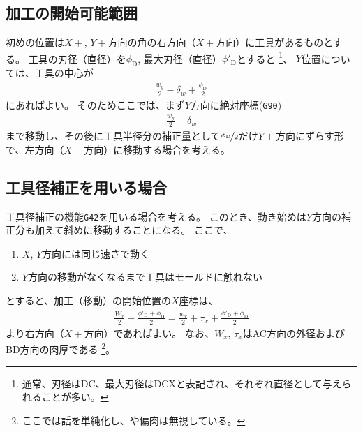 \subsection{加工の開始可能範囲}
初めの位置は$X+$, $Y+$方向の角の右方向（$X+$方向）に工具があるものとする。
工具の刃径（直径）を$\phi_\mathrm D$, 最大刃径（直径）$\phi'_\mathrm D$とすると
\footnote{通常、刃径はDC、最大刃径はDCXと表記され、それぞれ直径として与えられることが多い。}、
$Y$位置については、工具の中心が
\begin{align}
  \label{eq:tanmenKakouStartY}
  \frac{w_y}2-\delta_w+\frac{\phi_\mathrm D}2
\end{align}
にあればよい。
そのためここでは、まず$Y$方向に絶対座標(\verb|G90|)
\begin{align*}
  \frac{w_y}2-\delta_w
\end{align*}
まで移動し、その後に工具半径分の補正量として$\nicefrac{\phi_\mathrm D}2$だけ$Y+$方向にずらす形で、左方向（$X-$方向）に移動する場合を考える。


\subsection{工具径補正を用いる場合}
工具径補正の機能\verb|G42|を用いる場合を考える。
このとき、動き始めは$Y$方向の補正分も加えて斜めに移動することになる。
ここで、
\begin{enumerate}[label=\sarrow]
\item $X$, $Y$方向には同じ速さで動く
\item $Y$方向の移動がなくなるまで工具はモールドに触れない
\end{enumerate}
とすると、加工（移動）の開始位置の$X$座標は、
\begin{align*}
  \frac{W_x}2+\frac{\phi'_\mathrm D+\phi_\mathrm D}2
  = \frac{w_x}2+\tau_x+\frac{\phi'_\mathrm D+\phi_\mathrm D}2
\end{align*}
より右方向（$X+$方向）であればよい。
なお、$W_x$, $\tau_x$はAC方向の外径およびBD方向の肉厚である
\footnote{ここでは話を単純化し、\PlatingThk や偏肉は無視している。}。


